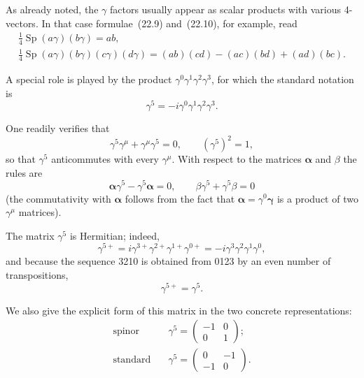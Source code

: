 As already noted, the $\gamma$ factors usually appear as scalar products with various 4-vectors. In that case formulae~(22.9) and~(22.10), for example, read
\begin{equation}
\begin{gathered}
\tfrac{1}{4}\operatorname{Sp}(a\gamma)(b\gamma) = ab,\\
\tfrac{1}{4}\operatorname{Sp}(a\gamma)(b\gamma)(c\gamma)(d\gamma) = (ab)(cd) - (ac)(bd) + (ad)(bc).
\end{gathered}
\tag{22.13}
\end{equation}

A special role is played by the product $\gamma^0\gamma^1\gamma^2\gamma^3$, for which the standard notation is
\begin{equation}
\gamma^5 = -i\gamma^0\gamma^1\gamma^2\gamma^3.
\tag{22.14}
\end{equation}

One readily verifies that
\begin{equation}
\gamma^5\gamma^\mu + \gamma^\mu\gamma^5 = 0,\qquad (\gamma^5)^2 = 1,
\tag{22.15}
\end{equation}
so that $\gamma^5$ anticommutes with every $\gamma^\mu$. With respect to the matrices $\boldsymbol{\alpha}$ and $\beta$ the rules are
\begin{equation}
\boldsymbol{\alpha}\gamma^5 - \gamma^5\boldsymbol{\alpha} = 0,\qquad \beta\gamma^5 + \gamma^5\beta = 0
\tag{22.16}
\end{equation}
(the commutativity with $\boldsymbol{\alpha}$ follows from the fact that $\boldsymbol{\alpha} = \gamma^0\boldsymbol{\gamma}$ is a product of two $\gamma^\mu$ matrices).

The matrix $\gamma^5$ is Hermitian; indeed,
\[
\gamma^{5+} = i\gamma^{3+}\gamma^{2+}\gamma^{1+}\gamma^{0+} = -i\gamma^3\gamma^2\gamma^1\gamma^0,
\]
and because the sequence 3210 is obtained from 0123 by an even number of transpositions,
\begin{equation}
\gamma^{5+} = \gamma^5.
\tag{22.17}
\end{equation}

We also give the explicit form of this matrix in the two concrete representations:
\begin{equation}
\begin{aligned}
\text{spinor}\quad &\gamma^5 = \begin{pmatrix} -1 & 0\\ 0 & 1 \end{pmatrix};\\
\text{standard}\quad &\gamma^5 = \begin{pmatrix} 0 & -1\\ -1 & 0 \end{pmatrix}.
\end{aligned}
\tag{22.18}
\end{equation}

